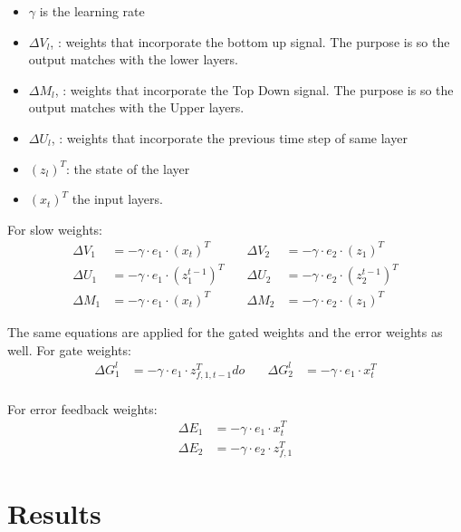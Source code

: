 \documentclass{article}
\begin{document}
\begin{itemize}
    \item $\gamma$ is the learning rate
    \item $\Delta V_l$, : weights that incorporate the bottom up signal. The purpose is so the output matches with the lower layers. 
    \item $\Delta M_l$, : weights that incorporate the Top Down signal. The purpose is so the output matches with the Upper layers. 
    \item $\Delta U_l$, :  weights that incorporate the previous time step of same layer 
    \item $(z_{l})^T$: the state of the layer
    \item $(x_t)^T $ the input layers. 
\end{itemize}

For slow weights:
\begin{align}
\Delta V_1 &= -\gamma \cdot e_1 \cdot (x_t)^T \quad &
\Delta V_2 &= -\gamma \cdot e_2 \cdot (z_{1})^T \\
\Delta U_1 &= -\gamma \cdot e_1 \cdot (z_1^{t-1})^T \quad &
\Delta U_2 &= -\gamma \cdot e_2 \cdot (z_2^{t-1})^T\\    %
\Delta M_1 &= -\gamma \cdot e_1 \cdot (x_t)^T \quad &
\Delta M_2 &= -\gamma \cdot e_2 \cdot (z_{1})^T
\end{align}

 The same equations are applied for the gated weights and the error weights as well. 
For gate weights:   %
\begin{align}
\Delta G_{1}^l &= -\gamma \cdot e_1 \cdot z_{f,1,t-1}^Tdo \quad &
\Delta G_{2}^l &= -\gamma \cdot e_1 \cdot x_t^T \\
\end{align}

For error feedback weights:
\begin{align}
\Delta E_1 &= -\gamma \cdot e_1 \cdot x_t^T \\
\Delta E_2 &= -\gamma \cdot e_2 \cdot z_{f,1}^T
\end{align}












\section{Results}
\end{document}
